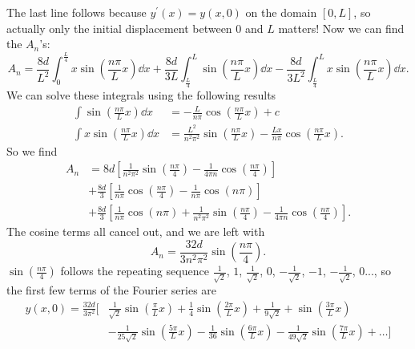 \documentclass[../classical_mechanics.tex]{subfiles}
\begin{document}
        The last line follows because $y^\prime(x)=y(x,0)$ on the domain $[0,L]$, so actually only the initial displacement between $0$ and $L$ matters!
        Now we can find the $A_n$'s:
        \begin{equation}
            A_n=\frac{8d}{L^2}\int_0^{\frac{L}{4}}x\sin\left(\frac{n\pi}{L}x\right)\dd{x}+\frac{8d}{3L}\int_{\frac{L}{4}}^L\sin\left(\frac{n\pi}{L}x\right)\dd{x}-\frac{8d}{3L^2}\int_{\frac{L}{4}}^L x\sin\left(\frac{n\pi}{L}x\right)\dd{x}.
        \end{equation}
        We can solve these integrals using the following results
        \begin{align}
            \int\sin\left(\frac{n\pi}{L}x\right)\dd{x}&=-\frac{L}{n\pi}\cos\left(\frac{n\pi}{L}x\right)+c\\
            \int x\sin\left(\frac{n\pi}{L}x\right)\dd{x}&=\frac{L^2}{n^2\pi^2}\sin\left(\frac{n\pi}{L}x\right)-\frac{Lx}{n\pi}\cos\left(\frac{n\pi}{L}x\right).
        \end{align}
        So we find
        \begin{equation}
            \begin{split}
                A_n&=8d\left[\frac{1}{n^2\pi^2}\sin\left(\frac{n\pi}{4}\right)-\frac{1}{4\pi n}\cos\left(\frac{n\pi}{4}\right)\right]\\
                &+\frac{8d}{3}\left[\frac{1}{n\pi}\cos\left(\frac{n\pi}{4}\right)-\frac{1}{n\pi}\cos(n\pi)\right]\\
                &+\frac{8d}{3}\left[\frac{1}{n\pi}\cos(n\pi)+\frac{1}{n^2\pi^2}\sin\left(\frac{n\pi}{4}\right)-\frac{1}{4\pi n}\cos\left(\frac{n\pi}{4}\right)\right].
            \end{split}
        \end{equation}
        The cosine terms all cancel out, and we are left with
        \begin{equation}
            A_n=\frac{32d}{3n^2\pi^2}\sin\left(\frac{n\pi}{4}\right).
        \end{equation}
        $\sin\left(\frac{n\pi}{4}\right)$ follows the repeating sequence $\frac{1}{\sqrt{2}}$, $1$, $\frac{1}{\sqrt{2}}$, $0$, $-\frac{1}{\sqrt{2}}$, $-1$, $-\frac{1}{\sqrt{2}}$, $0$..., so the first few terms of the Fourier series are
        \begin{equation}
            \begin{split}
                y(x,0)=\frac{32d}{3\pi^2}\biggl[&\frac{1}{\sqrt{2}}\sin\left(\frac{\pi}{L}x\right)+\frac{1}{4}\sin\left(\frac{2\pi}{L}x\right)+\frac{1}{9\sqrt{2}}+\sin\left(\frac{3\pi}{L}x\right)\\
                &-\frac{1}{25\sqrt{2}}\sin\left(\frac{5\pi}{L}x\right)-\frac{1}{36}\sin\left(\frac{6\pi}{L}x\right)-\frac{1}{49\sqrt{2}}\sin\left(\frac{7\pi}{L}x\right)+\dots\biggr]
            \end{split}
        \end{equation}
\end{document}
